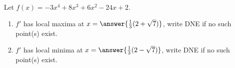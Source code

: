 \documentclass{ximera}
\author{Gregory Hartman \and Matthew Carr}
\begin{document}
\begin{exercise}






Let $f(x)=-3x^4+8x^3+6x^2-24x+2$.
\begin{enumerate}
\item		$f'$ has local maxima at $x=\answer{\frac{1}{3}(2+\sqrt{7})}$, write DNE if no such point(s) exist.
\item		$f'$ has local minima at $x=\answer{\frac{1}{3}(2-\sqrt{7})}$, write DNE if no such point(s) exist.
\end{enumerate}

\end{exercise}
\end{document}
